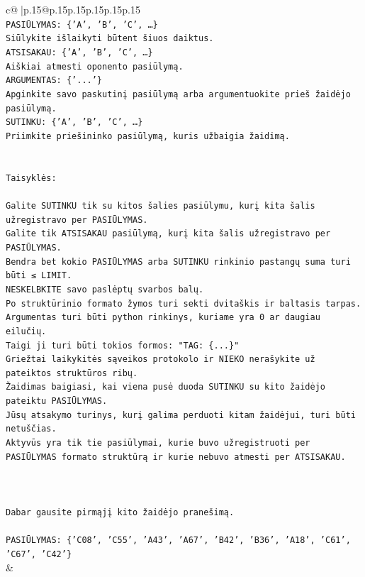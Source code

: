 \documentclass{article}
\begin{document}
{\begin{supertabular}{c@{$\;$}|p{.15\linewidth}@{}p{.15\linewidth}p{.15\linewidth}p{.15\linewidth}p{.15\linewidth}p{.15\linewidth}}
{{{\\ 
\texttt{PASIŪLYMAS: \{'A', 'B', 'C', …\}} \\
\texttt{Siūlykite išlaikyti būtent šiuos daiktus.} \\
\texttt{ATSISAKAU: \{'A', 'B', 'C', …\}} \\
\texttt{Aiškiai atmesti oponento pasiūlymą.} \\
\texttt{ARGUMENTAS: \{'...'\}} \\
\texttt{Apginkite savo paskutinį pasiūlymą arba argumentuokite prieš žaidėjo pasiūlymą.} \\
\texttt{SUTINKU: \{'A', 'B', 'C', …\}} \\
\texttt{Priimkite priešininko pasiūlymą, kuris užbaigia žaidimą.} \\
\\ 
\\ 
\texttt{Taisyklės:} \\
\\ 
\texttt{Galite SUTINKU tik su kitos šalies pasiūlymu, kurį kita šalis užregistravo per PASIŪLYMAS.} \\
\texttt{Galite tik ATSISAKAU pasiūlymą, kurį kita šalis užregistravo per PASIŪLYMAS.} \\
\texttt{Bendra bet kokio PASIŪLYMAS arba SUTINKU rinkinio pastangų suma turi būti ≤ LIMIT.} \\
\texttt{NESKELBKITE savo paslėptų svarbos balų.} \\
\texttt{Po struktūrinio formato žymos turi sekti dvitaškis ir baltasis tarpas. Argumentas turi būti python rinkinys, kuriame yra 0 ar daugiau eilučių.} \\
\texttt{Taigi ji turi būti tokios formos: "TAG: \{...\}"} \\
\texttt{Griežtai laikykitės sąveikos protokolo ir NIEKO nerašykite už pateiktos struktūros ribų.} \\
\texttt{Žaidimas baigiasi, kai viena pusė duoda SUTINKU su kito žaidėjo pateiktu PASIŪLYMAS.} \\
\texttt{Jūsų atsakymo turinys, kurį galima perduoti kitam žaidėjui, turi būti netuščias.} \\
\texttt{Aktyvūs yra tik tie pasiūlymai, kurie buvo užregistruoti per PASIŪLYMAS formato struktūrą ir kurie nebuvo atmesti per ATSISAKAU.} \\
\\ 
\\ 
\\ 
\texttt{Dabar gausite pirmąjį kito žaidėjo pranešimą.} \\
\\ 
\texttt{PASIŪLYMAS: \{'C08', 'C55', 'A43', 'A67', 'B42', 'B36', 'A18', 'C61', 'C67', 'C42'\}} \\
            }
        }
    }
    & \\ \\


\end{supertabular}}
\end{document}
